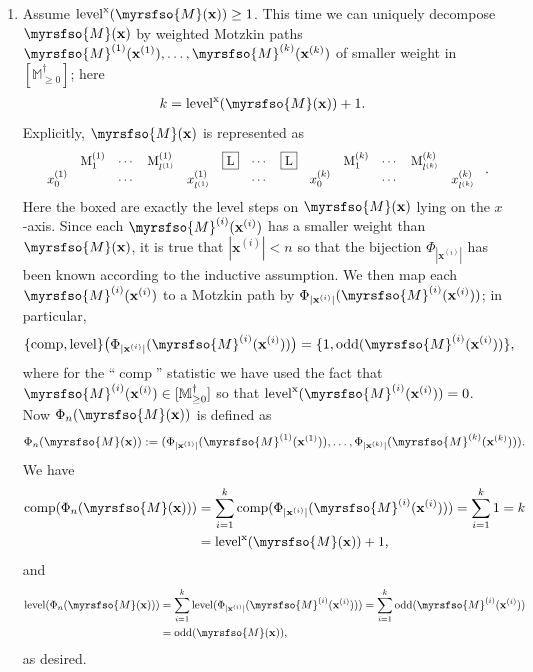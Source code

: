 \documentclass[12pt,reqno]{amsart}
\numberwithin{equation}{section}
\theoremstyle{theorem}
\theoremstyle{definition}
\theoremstyle{named}
\newcommand{\odd}{\operatorname{odd}}
\newcommand{\comp}{\operatorname{comp}}
\newcommand{\level}{\operatorname{level}}
\newcommand{\x}{\operatorname{x}}
\newcommand{\cM}{\myrsfso{M}}
\newcommand{\bbM}{\mathbb{M}}
\newcommand{\bfx}{\mathbf{x}}
\newcommand{\rmM}{\mathrm{M}}
\newcommand{\rL}{\mathrm{L}}
\begin{document}
\begin{enumerate}[label={\textup{(\arabic{*})}}, leftmargin=*, labelsep=5pt, align=left, itemsep=2pt, topsep=2pt, parsep=2pt]
	\item Assume $\level^{\x}(\cM(\bfx)) \ge 1$. This time we can uniquely decompose $\cM(\bfx)$ by weighted Motzkin paths $\cM^{(1)}(\bfx^{(1)}),\ldots,\cM^{(k)}(\bfx^{(k)})$ of smaller weight in $[\bbM_{\ge 0}^\dagger]$; here
	\begin{align*}
		k = \level^{\x}(\cM(\bfx)) + 1.
	\end{align*}
	Explicitly, $\cM(\bfx)$ is represented as
	\begin{align*}
		\scalebox{0.9}{
			$\begin{array}{ccccccccccccc}
				& \rmM_1^{(1)} & \cdots & \rmM_{l^{(1)}}^{(1)} & & \fbox{$\rL$} & \cdots & \fbox{$\rL$} & & \rmM_1^{(k)} & \cdots & \rmM_{l^{(k)}}^{(k)}\\
				x_0^{(1)} & & \cdots & & x_{l^{(1)}}^{(1)} & & \cdots & & x_0^{(k)} & & \cdots & & x_{l^{(k)}}^{(k)}
			\end{array}$
		}.
	\end{align*}
	Here the boxed \fbox{$\rL$} are exactly the level steps on $\cM(\bfx)$ lying on the $x$-axis. Since each $\cM^{(i)}(\bfx^{(i)})$ has a smaller weight than $\cM(\bfx)$, it is true that $|\bfx^{(i)}| < n$ so that the bijection $\Phi_{|\bfx^{(i)}|}$ has been known according to the inductive assumption. We then map each $\cM^{(i)}(\bfx^{(i)})$ to a Motzkin path by $\Phi_{|\bfx^{(i)}|}(\cM^{(i)}(\bfx^{(i)}))$; in particular,
	\begin{align*}
		\{\comp,\level\} \big(\Phi_{|\bfx^{(i)}|}(\cM^{(i)}(\bfx^{(i)}))\big) = \{1, \odd(\cM^{(i)}(\bfx^{(i)}))\},
	\end{align*}
	where for the ``$\comp$'' statistic we have used the fact that $\cM^{(i)}(\bfx^{(i)})\in [\bbM_{\ge 0}^\dagger]$ so that $\level^{\x}(\cM^{(i)}(\bfx^{(i)})) = 0$. Now $\Phi_n(\cM(\bfx))$ is defined as
	\begin{align*}
		\Phi_n(\cM(\bfx)) := (\Phi_{|\bfx^{(1)}|}(\cM^{(1)}(\bfx^{(1)})),\ldots,\Phi_{|\bfx^{(k)}|}(\cM^{(k)}(\bfx^{(k)}))).
	\end{align*}
	We have
	\begin{align*}
		\comp(\Phi_n(\cM(\bfx))) &= \sum_{i=1}^k \comp(\Phi_{|\bfx^{(i)}|}(\cM^{(i)}(\bfx^{(i)}))) = \sum_{i=1}^k 1 = k\\
		& = \level^{\x}(\cM(\bfx)) + 1,
	\end{align*}
	and
	\begin{align*}
		\level(\Phi_n(\cM(\bfx))) &= \sum_{i=1}^k \level(\Phi_{|\bfx^{(i)}|}(\cM^{(i)}(\bfx^{(i)}))) = \sum_{i=1}^k \odd(\cM^{(i)}(\bfx^{(i)}))\\
		& = \odd(\cM(\bfx)),
	\end{align*}
	as desired.
\end{enumerate}
\end{document}

